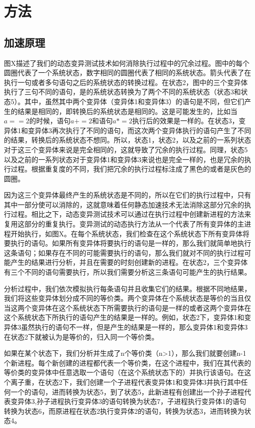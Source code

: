 \documentclass[nofonts]{ctexrep}
\begin{document}
\chapter{方法}
\section{加速原理}
图X描述了我们的动态变异测试技术如何消除执行过程中的冗余过程。图中的每个圆圈代表了一个系统状态，数字相同的圆圈代表了相同的系统状态。箭头代表了在执行一句或者多句语句之后的系统状态的转换过程。在状态2，图中的三个变异体执行了三句不同的语句，是的系统状态转换为了两个不同的系统状态（状态3和状态5）。其中，虽然其中两个变异体（变异体1和变异体3）的语句是不同，但它们产生的结果是相同的，即转换后的系统状态是相同的。这是可能发生的，比如当$a==2$的时候，语句$a+=2$和语句$a*=2$执行后的效果是一样的。在状态3，变异体1和变异体3再次执行了不同的语句，而这次两个变异体执行的语句产生了不同的结果，转换后的系统状态不想同。所以，状态1，状态2，以及之前的一系列状态对于这三个变异体来说是完全相同的，这就导致了冗余的执行过程。同理，状态5以及之前的一系列状态对于变异体1和变异体3来说也是完全一样的，也是冗余的执行过程。根据重复度的不同，我们把冗余的执行过程标注成了黑色的或者是灰色的圆圈。

因为这三个变异体最终产生的系统状态是不同的，所以在它们的执行过程中，只有其中一部分使可以消除的，这就意味着任何静态加速技术无法消除这部分冗余的执行过程。相比之下，动态变异测试技术可以通过在执行过程中创建新进程的方法来复用这部分的重复执行。变异测试的动态执行方法从一个代表了所有变异体的主进程开始执行，如图X。在每个系统状态，我们检查在这个系统状态下所有变异体将要执行的语句。如果所有变异体将要执行的语句是一样的，那么我们就简单地执行这条语句；如果存在不同的可能需要执行的语句，那么我们就对不同的执行过程可能产生的结果进行分析，并且在需要的时刻创建新的进程。在状态2，三个变异体有三个不同的语句需要执行，所以我们需要分析这三条语句可能产生的执行结果。

分析过程中，我们依次模拟执行每条语句并且收集它们的结果。根据不同地结果，我们将这些变异体划分成不同的等价类。两个变异体在个系统状态是等价的当且仅当这两个变异体在这个系统状态下所需要执行的语句是一样的或者这两个变异体在这个系统状态下所执行的语句产生的结果是一样的。例如，状态2下，变异体1和变异体3虽然执行的语句不一样，但是产生的结果是一样的，那么变异体1和变异体3在状态2下就被认为是等价的，归入同一个等价类。

如果在某个状态下，我们分析并生成了n个等价类（n>1），那么我们就要创建n-1个新进程。每个新创建的进程都代表一个等价类，在这个进程中，我们在其代表的等价类的变异体中任意选取一个语句（在这个系统状态下的）并执行该语句。在这个离子重，在状态2下，我们创建一个子进程代表变异体1和变异体3并执行其中任何一个的语句，进而转换为状态5，到了状态5，此新进程有创建出一个孙子进程代表变异体3,孙子进程执行变异体3的语句转换为状态7，子进程执行变异体1的语句转换为状态6，而原进程在状态2执行变异体2的语句，转换为状态3，进而转换为状态4。
\end{document}
